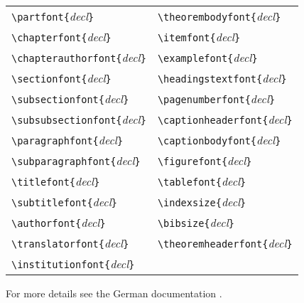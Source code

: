 \begin{center}\small
\begin{tabular}{@{}ll@{}}
\verb|\partfont{|\emph{decl}\verb|}|            &\verb|\theorembodyfont{|\emph{decl}\verb|}|  \\
\verb|\chapterfont{|\emph{decl}\verb|}|         &\verb|\itemfont{|\emph{decl}\verb|}|         \\  
\verb|\chapterauthorfont{|\emph{decl}\verb|}|   &\verb|\examplefont{|\emph{decl}\verb|}|      \\  
\verb|\sectionfont{|\emph{decl}\verb|}|         &\verb|\headingstextfont{|\emph{decl}\verb|}|\\   
\verb|\subsectionfont{|\emph{decl}\verb|}|      &\verb|\pagenumberfont{|\emph{decl}\verb|}|\\     
\verb|\subsubsectionfont{|\emph{decl}\verb|}|   &\verb|\captionheaderfont{|\emph{decl}\verb|}|\\  
\verb|\paragraphfont{|\emph{decl}\verb|}|       &\verb|\captionbodyfont{|\emph{decl}\verb|}|\\    
\verb|\subparagraphfont{|\emph{decl}\verb|}|    &\verb|\figurefont{|\emph{decl}\verb|}|\\         
\verb|\titlefont{|\emph{decl}\verb|}|           &\verb|\tablefont{|\emph{decl}\verb|}|\\          
\verb|\subtitlefont{|\emph{decl}\verb|}|        &\verb|\indexsize{|\emph{decl}\verb|}|\\       
\verb|\authorfont{|\emph{decl}\verb|}|          &\verb|\bibsize{|\emph{decl}\verb|}|\\          
\verb|\translatorfont{|\emph{decl}\verb|}|      &\verb|\theoremheaderfont{|\emph{decl}\verb|}|\\
\verb|\institutionfont{|\emph{decl}\verb|}|     &\\
\end{tabular}
\end{center}

\iflocalin
For more details see the German documentation
.
\fi


